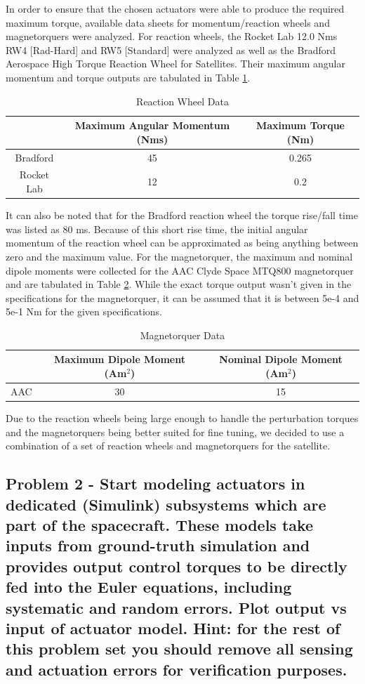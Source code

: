 In order to ensure that the chosen actuators were able to produce the required maximum torque, available data sheets for momentum/reaction wheels and magnetorquers were analyzed. For reaction wheels, the Rocket Lab 12.0 Nms RW4 [Rad-Hard] and RW5 [Standard] were analyzed as well as the Bradford Aerospace High Torque Reaction Wheel for Satellites. Their maximum angular momentum and torque outputs are tabulated in Table \ref{table:rw}.

\begin{table}
\begin{tabular}{c|c|c}
    & Maximum Angular Momentum (Nms) & Maximum Torque (Nm) \\
    \hline 
    Bradford & 45 & 0.265 \\
    \hline 
    Rocket Lab & 12 & 0.2 \\
\end{tabular}
\caption{Reaction Wheel Data}
\label{table:rw}
\end{table}

It can also be noted that for the Bradford reaction wheel the torque rise/fall time was listed as 80 ms. Because of this short rise time, the initial angular momentum of the reaction wheel can be approximated as being anything between zero and the maximum value. For the magnetorquer, the maximum and nominal dipole moments were collected for the AAC Clyde Space MTQ800 magnetorquer and are tabulated in Table \ref{table:magnetorquer}. While the exact torque output wasn't given in the specifications for the magnetorquer, it can be assumed that it is between 5e-4 and 5e-1 Nm for the given specifications. 

\begin{table}
\begin{tabular}{c|c|c}
    & Maximum Dipole Moment (Am$^2$) & Nominal Dipole Moment (Am$^2$) \\
    \hline 
    AAC & 30 & 15 \\
\end{tabular}
\caption{Magnetorquer Data}
\label{table:magnetorquer}
\end{table}

Due to the reaction wheels being large enough to handle the perturbation torques and the magnetorquers being better suited for fine tuning, we decided to use a combination of a set of reaction wheels and magnetorquers for the satellite.

\subsection{Problem 2 - Start modeling actuators in dedicated (Simulink) subsystems which are part of the spacecraft. These models take inputs from ground-truth simulation and provides output control torques to be directly fed into the Euler equations, including systematic and random errors. Plot output vs input of actuator model. Hint: for the rest of this problem set you should remove all sensing and actuation errors for verification purposes.}

